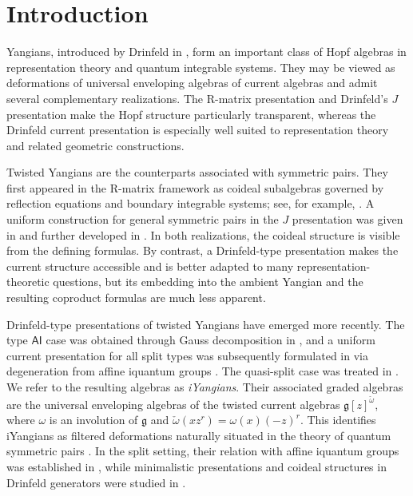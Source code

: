 \documentclass[11pt,reqno]{amsart}
\numberwithin{equation}{section}
\theoremstyle{definition}
\theoremstyle{remark}
\newcommand{\g}{\mathfrak{g}}
\begin{document}
\section{Introduction}

Yangians, introduced by Drinfeld in \cite{Dri85,Dri87}, form an important class of Hopf algebras in representation theory and quantum integrable systems. They may be viewed as deformations of universal enveloping algebras of current algebras and admit several complementary realizations. The R-matrix presentation and Drinfeld's $J$ presentation make the Hopf structure particularly transparent, whereas the Drinfeld current presentation is especially well suited to representation theory and related geometric constructions.

Twisted Yangians are the counterparts associated with symmetric pairs. They first appeared in the R-matrix framework as coideal subalgebras governed by reflection equations and boundary integrable systems; see, for example, \cite{Che84,Skl88,Ols92,MNO96,MR02,GR16}. A uniform construction for general symmetric pairs in the $J$ presentation was given in \cite{Mac02} and further developed in \cite{BR17}. In both realizations, the coideal structure is visible from the defining formulas. By contrast, a Drinfeld-type presentation makes the current structure accessible and is better adapted to many representation-theoretic questions, but its embedding into the ambient Yangian and the resulting coproduct formulas are much less apparent.

Drinfeld-type presentations of twisted Yangians have emerged more recently. The type $\mathsf{AI}$ case was obtained through Gauss decomposition in \cite{LWZ25GD}, and a uniform current presentation for all split types was subsequently formulated in \cite{LWZ25affine} via degeneration from affine iquantum groups \cite{LW21,Zha22}. The quasi-split case was treated in \cite{LZ24,Lu27super}. We refer to the resulting algebras as \emph{iYangians}. Their associated graded algebras are the universal enveloping algebras of the twisted current algebras $\g[z]^{\check\omega}$, where $\omega$ is an involution of $\g$ and $\check\omega(xz^r)=\omega(x)(-z)^r$. This identifies iYangians as filtered deformations naturally situated in the theory of quantum symmetric pairs \cite{Kolb14}. In the split setting, their relation with affine iquantum groups was established in \cite{LWZ25affine}, while minimalistic presentations and coideal structures in Drinfeld generators were studied in \cite{Lu26min}.
\end{document}
